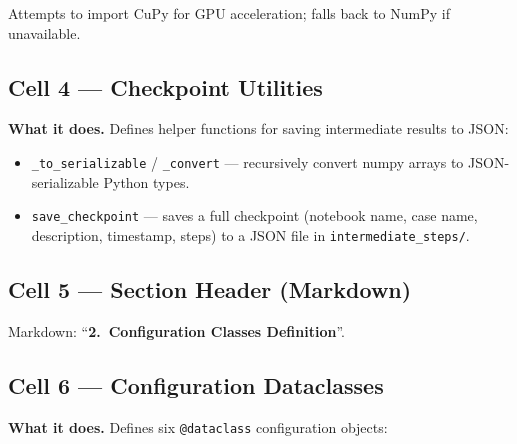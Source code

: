\documentclass[11pt,a4paper]{article}
\begin{document}
Attempts to import CuPy for GPU acceleration; falls back to NumPy if unavailable.

\subsection{Cell 4 --- Checkpoint Utilities}

\textbf{What it does.}
Defines helper functions for saving intermediate results to JSON:
\begin{itemize}
    \item \texttt{\_to\_serializable} / \texttt{\_convert} --- recursively convert numpy arrays
          to JSON-serializable Python types.
    \item \texttt{save\_checkpoint} --- saves a full checkpoint (notebook name, case name,
          description, timestamp, steps) to a JSON file in \texttt{intermediate\_steps/}.
\end{itemize}

\subsection{Cell 5 --- Section Header (Markdown)}
Markdown: ``\textbf{2.\ Configuration Classes Definition}''.

\subsection{Cell 6 --- Configuration Dataclasses}
\label{sec:cell6}

\textbf{What it does.}
Defines six \texttt{@dataclass} configuration objects:
\end{document}
